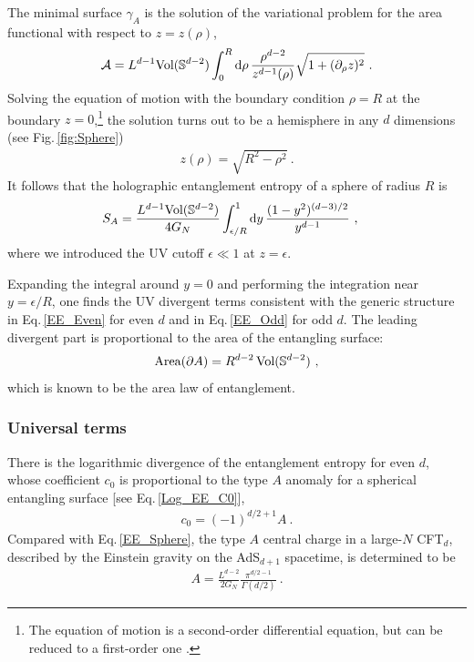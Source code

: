 The minimal surface $\gamma_A$ is the solution of the variational problem for the area functional with respect to $z=z(\rho)$,
\begin{align}\label{areaSp}
{\cal A} = L^{d-1} \text{Vol}(\mathbb{S}^{d-2}) \int_0^R \mathrm{d}\rho\, \frac{\rho^{d-2}}{z^{d-1}(\rho)} \sqrt{1+ (\partial_\rho z)^2} \ .
\end{align}
Solving the equation of motion with the boundary condition $\rho=R$ at the boundary $z=0$,\footnote{The equation of motion is a second-order differential equation, but can be reduced to a first-order one \cite{Bakhmatov:2017ihw,Colgain:2018tzo}.}
the solution turns out to be a hemisphere in any $d$ dimensions \cite{Ryu:2006bv} (see Fig.\,\ref{fig:Sphere})
\begin{align}\label{Sp_sol}
z(\rho) = \sqrt{R^2 - \rho^2} \ .
\end{align}
It follows that the holographic entanglement entropy of a sphere of radius $R$ is
\begin{align}\label{EE_Sphere}
\begin{aligned}
S_A = \frac{L^{d-1}\text{Vol}(\mathbb{S}^{d-2})}{4G_N} & \int_{\epsilon/R}^1 \mathrm{d} y\, \frac{(1-y^2)^{(d-3)/2}}{y^{d-1}} \ , 
\end{aligned}
\end{align}
where we introduced the UV cutoff $\epsilon \ll 1$ at $z=\epsilon$.

Expanding the integral around $y=0$ and performing the integration near $y=\epsilon /R$, one finds the UV divergent terms consistent with the generic structure in Eq.\,\eqref{EE_Even} for even $d$ and in Eq.\,\eqref{EE_Odd} for odd $d$.
The leading divergent part is proportional to the area of the entangling surface: 
\begin{align}
	\text{Area}(\partial A) = R^{d-2}\,\text{Vol}(\mathbb{S}^{d-2}) \ ,
\end{align}
which is known to be the area law of entanglement.


\subsubsection{Universal terms}

There is the logarithmic divergence of the entanglement entropy for even $d$, whose coefficient $c_0$ is proportional to the type $A$ anomaly for a spherical entangling surface [see Eq.\,\eqref{Log_EE_C0}],
\begin{align}
	c_0 = (-1)^{d/2+1} A \ .
\end{align}
Compared with Eq.\,\eqref{EE_Sphere}, the type $A$ central charge in a large-$N$ CFT$_d$, described by the Einstein gravity on the AdS$_{d+1}$ spacetime, is determined to be \cite{Myers:2010xs,Myers:2010tj}
\begin{align}
	A = \frac{L^{d-2}}{2G_N} \frac{\pi^{d/2 -1}}{\Gamma (d/2)} \ .
\end{align}

